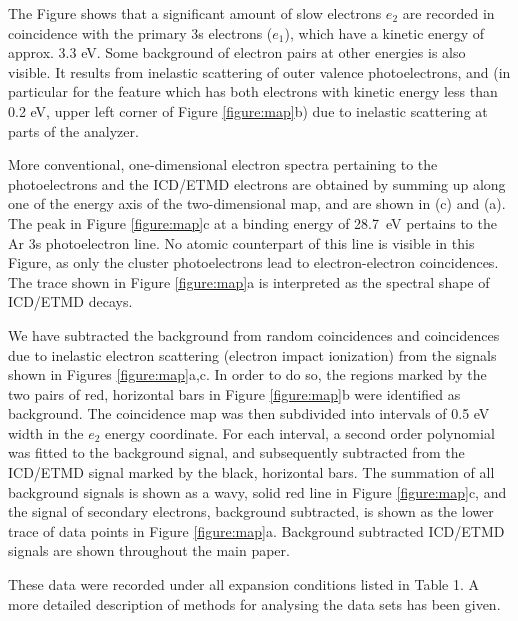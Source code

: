 \documentclass[journal=jpccck,manuscript=suppinfo]{achemso}
\begin{document}
The Figure shows that a significant amount of slow electrons $e_2$ are recorded in coincidence with the primary 3s electrons ($e_1$), which have a kinetic energy of approx. 3.3 eV. 
Some background of electron pairs at other energies is also visible.
It results from inelastic scattering of outer valence photoelectrons, and (in particular for the feature which has both electrons with kinetic energy less than 0.2 eV, upper left corner of Figure \ref{figure:map}b) due to inelastic scattering at parts of the analyzer.

More conventional, one-dimensional electron spectra pertaining to the photoelectrons and the ICD/ETMD electrons are obtained by summing up along one of the energy axis of the two-dimensional map, and are shown in (c) and (a). 
The peak in Figure \ref{figure:map}c at a binding energy of 28.7~eV pertains to the Ar 3s photoelectron line.
No atomic counterpart of this line is visible in this Figure, as only the cluster photoelectrons lead to electron-electron coincidences.
The trace shown in Figure \ref{figure:map}a is interpreted as the spectral shape of ICD/ETMD decays.

We have subtracted the background from random coincidences and coincidences due to inelastic electron scattering (electron impact ionization) from the signals shown in Figures \ref{figure:map}a,c.
In order to do so, the regions marked by the two pairs of red, horizontal bars in Figure \ref{figure:map}b were identified as background.
The coincidence map was then subdivided into intervals of 0.5 eV width in the $e_2$ energy coordinate.
For each interval, a second order polynomial was fitted to the background signal, and subsequently subtracted from the ICD/ETMD signal marked by the black, horizontal bars.
The summation of all background signals is shown as a wavy, solid red line in Figure \ref{figure:map}c, and the signal of secondary electrons, background subtracted, is shown as the lower trace of data points in Figure \ref{figure:map}a.
Background subtracted ICD/ETMD signals are shown throughout the main paper.

These data were recorded under all expansion conditions listed in Table 1.
A more detailed description of methods for analysing the data sets has been given.\cite{Foerstel_phd}
%
%
\end{document}
